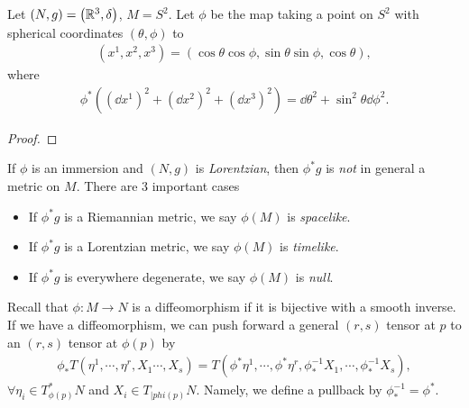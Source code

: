
\begin{exercise}
    Let $\left( N,g \right) = \left( \mathbb{R}^3, \delta \right) $, $M = S^2$. Let $\phi$ be the map taking a point on $S^2 $ with spherical coordinates $\left( \theta, \phi \right) $ to 
    \begin{align}
        \left( x^{1}, x^{2}, x^{3} \right) = \left( \cos \theta \cos \phi, \sin \theta \sin \phi, \cos \theta \right) 
    ,\end{align}
    where
    \begin{align}
        \phi^{*}\left( \left( \dd{x}^{1} \right)^2 + \left( \dd{x}^{2} \right)^2 + \left( \dd{x}^{3} \right)^2 \right) = \dd{\theta}^2 + \sin^2\theta \dd{\phi}^2
    .\end{align}
\end{exercise}

\begin{proof}
    
\end{proof}

If $\phi$ is an immersion and $\left( N,g \right) $ is \textit{Lorentzian}, then $\phi^* g$ is \textit{not} in general a metric on $M$. There are 3 important cases
\begin{itemize}
    \item If $\phi^{*} g$ is a Riemannian metric, we say $\phi \left( M \right) $ is \textit{spacelike}.
    \item If $\phi^{*} g$ is a Lorentzian metric, we say $\phi \left( M \right) $ is \textit{timelike}.
    \item If $\phi^{*} g$ is everywhere degenerate, we say $\phi \left( M \right) $ is \textit{null}.
\end{itemize}

Recall that $\phi : M \to N$ is a diffeomorphism if it is bijective with a smooth inverse. If we have a diffeomorphism, we can push forward a general $\left( r,s \right) $ tensor at $p$ to an $\left( r,s \right) $ tensor at $\phi \left( p \right) $ by
\begin{align}
    \phi_{*} T \left( \eta^{1}, \cdots, \eta^{r}, X_1 \cdots , X_s \right) = T \left( \phi^{*} \eta^{1}, \cdots, \phi^{*} \eta^{r}, \phi_*^{-1} X_1,\cdots, \phi_*^{-1} X_s \right) 
,\end{align}
$\forall  \eta_i \in T_{\phi \left( p \right) }^{*} N$ and $X_i \in T_{|phi \left( p \right) } N$. Namely, we define a pullback by $\phi_*^{-1} = \phi^{*}$.

